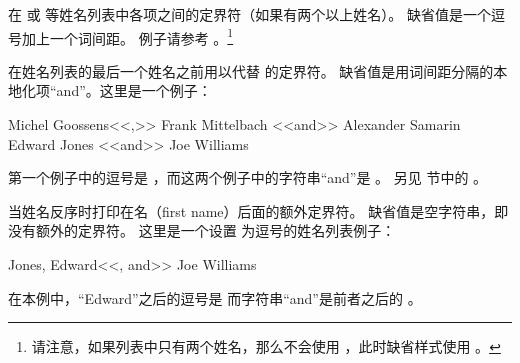 \begin{ltxsyntax}
\CSdelimMark
在  或  等姓名列表中各项之间的定界符（如果有两个以上姓名）。
缺省值是一个逗号加上一个词间距。
例子请参考 。\footnote{%
	请注意，如果列表中只有两个姓名，那么不会使用 ，此时缺省样式使用 。
}

\CSdelimMark
在姓名列表的最后一个姓名之前用以代替  的定界符。
缺省值是用词间距分隔的本地化项“and”。这里是一个例子：

\begin{ltxexample}
Michel Goossens<<,>> Frank Mittelbach <<and>> Alexander Samarin
Edward Jones <<and>> Joe Williams
\end{ltxexample}
%
第一个例子中的逗号是 ，而这两个例子中的字符串“and”是 。
另见  节中的 。

\CSdelimMark
当姓名反序时打印在名（first name）后面的额外定界符。
缺省值是空字符串，即没有额外的定界符。
这里是一个设置  为逗号的姓名列表例子：

\begin{ltxexample}
Jones, Edward<<, and>> Joe Williams
\end{ltxexample}
%
在本例中，“Edward”之后的逗号是  而字符串“and”是前者之后的 。


\end{ltxsyntax}
